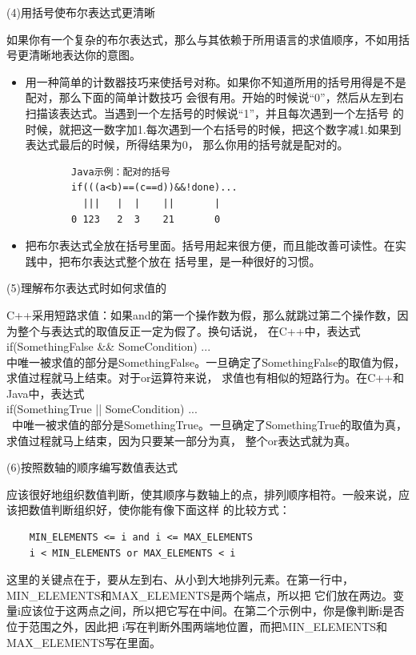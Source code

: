\documentclass{article}
\begin{document}
\par
(4)用括号使布尔表达式更清晰
\par
如果你有一个复杂的布尔表达式，那么与其依赖于所用语言的求值顺序，不如用括号更清晰地表达你的意图。
\begin{itemize}
    \item 用一种简单的计数器技巧来使括号对称。如果你不知道所用的括号用得是不是配对，那么下面的简单计数技巧
    会很有用。开始的时候说“0”，然后从左到右扫描该表达式。当遇到一个左括号的时候说“1”，并且每次遇到一个左括号
    的时候，就把这一数字加1.每次遇到一个右括号的时候，把这个数字减1.如果到表达式最后的时候，所得结果为0，
    那么你用的括号就是配对的。
    \begin{lstlisting}
        Java示例：配对的括号
        if(((a<b)==(c==d))&&!done)...
          |||   |  |    ||       |
        0 123   2  3    21       0
    \end{lstlisting}
    \item 把布尔表达式全放在括号里面。括号用起来很方便，而且能改善可读性。在实践中，把布尔表达式整个放在
    括号里，是一种很好的习惯。
\end{itemize}

\par
(5)理解布尔表达式时如何求值的
\par
C++采用短路求值：如果and的第一个操作数为假，那么就跳过第二个操作数，因为整个与表达式的取值反正一定为假了。换句话说，
在C++中，表达式\\
if(SomethingFalse \&\& SomeCondition) ...\\
中唯一被求值的部分是SomethingFalse。一旦确定了SomethingFalse的取值为假，求值过程就马上结束。对于or运算符来说，
求值也有相似的短路行为。在C++和Java中，表达式\\
if(SomethingTrue || SomeCondition) ...\\\
中唯一被求值的部分是SomethingTrue。一旦确定了SomethingTrue的取值为真，求值过程就马上结束，因为只要某一部分为真，
整个or表达式就为真。

\par
(6)按照数轴的顺序编写数值表达式
\par
应该很好地组织数值判断，使其顺序与数轴上的点，排列顺序相符。一般来说，应该把数值判断组织好，使你能有像下面这样
的比较方式：
\begin{lstlisting}
    MIN_ELEMENTS <= i and i <= MAX_ELEMENTS
    i < MIN_ELEMENTS or MAX_ELEMENTS < i
\end{lstlisting}
这里的关键点在于，要从左到右、从小到大地排列元素。在第一行中，MIN\_ELEMENTS和MAX\_ELEMENTS是两个端点，所以把
它们放在两边。变量i应该位于这两点之间，所以把它写在中间。在第二个示例中，你是像判断i是否位于范围之外，因此把
i写在判断外围两端地位置，而把MIN\_ELEMENTS和MAX\_ELEMENTS写在里面。
\end{document}
